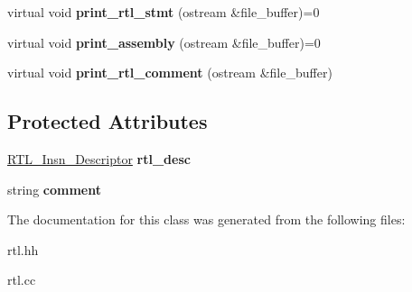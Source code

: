 \begin{DoxyCompactItemize}
\item 
\mbox{\label{classRTL__Stmt_a24c1f127532d5c78784408daf9477da7}} 
virtual void {\bfseries print\+\_\+rtl\+\_\+stmt} (ostream \&file\+\_\+buffer)=0
\item 
\mbox{\label{classRTL__Stmt_a0e8a189ccfa3bfa4b82bb5d2c53fa2c4}} 
virtual void {\bfseries print\+\_\+assembly} (ostream \&file\+\_\+buffer)=0
\item 
\mbox{\label{classRTL__Stmt_a491828ecf3d925fe4d5e1cac78f3994d}} 
virtual void {\bfseries print\+\_\+rtl\+\_\+comment} (ostream \&file\+\_\+buffer)
\end{DoxyCompactItemize}
\subsection*{Protected Attributes}
\begin{DoxyCompactItemize}
\item 
\mbox{\label{classRTL__Stmt_a6a1dbcd0c285596d860ed0d63f7beae2}} 
\hyperlink{classRTL__Insn__Descriptor}{R\+T\+L\+\_\+\+Insn\+\_\+\+Descriptor} {\bfseries rtl\+\_\+desc}
\item 
\mbox{\label{classRTL__Stmt_a8d7ca4991695ce8d7e07c33711282f5f}} 
string {\bfseries comment}
\end{DoxyCompactItemize}


The documentation for this class was generated from the following files\+:\begin{DoxyCompactItemize}
\item 
rtl.\+hh\item 
rtl.\+cc\end{DoxyCompactItemize}
